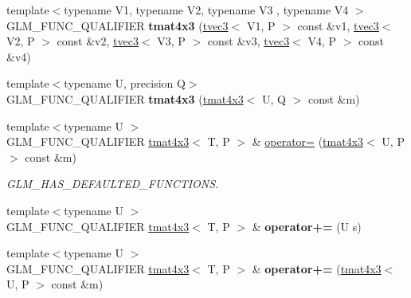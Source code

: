 \begin{DoxyCompactItemize}
\item 
\mbox{\label{structglm_1_1tmat4x3_a39c67aaaba4ee82e36a172a8704a4920}} 
{\footnotesize template$<$typename V1, typename V2, typename V3 , typename V4 $>$ }\\G\+L\+M\+\_\+\+F\+U\+N\+C\+\_\+\+Q\+U\+A\+L\+I\+F\+I\+ER {\bfseries tmat4x3} (\hyperlink{structglm_1_1tvec3}{tvec3}$<$ V1, P $>$ const \&v1, \hyperlink{structglm_1_1tvec3}{tvec3}$<$ V2, P $>$ const \&v2, \hyperlink{structglm_1_1tvec3}{tvec3}$<$ V3, P $>$ const \&v3, \hyperlink{structglm_1_1tvec3}{tvec3}$<$ V4, P $>$ const \&v4)
\item 
\mbox{\label{structglm_1_1tmat4x3_a977e48f213b5720e0c38342c955cfd3e}} 
{\footnotesize template$<$typename U, precision Q$>$ }\\G\+L\+M\+\_\+\+F\+U\+N\+C\+\_\+\+Q\+U\+A\+L\+I\+F\+I\+ER {\bfseries tmat4x3} (\hyperlink{structglm_1_1tmat4x3}{tmat4x3}$<$ U, Q $>$ const \&m)
\item 
\mbox{\label{structglm_1_1tmat4x3_a45e2023a951f58d15675733993dd3f7a}} 
{\footnotesize template$<$typename U $>$ }\\G\+L\+M\+\_\+\+F\+U\+N\+C\+\_\+\+Q\+U\+A\+L\+I\+F\+I\+ER \hyperlink{structglm_1_1tmat4x3}{tmat4x3}$<$ T, P $>$ \& \hyperlink{structglm_1_1tmat4x3_a45e2023a951f58d15675733993dd3f7a}{operator=} (\hyperlink{structglm_1_1tmat4x3}{tmat4x3}$<$ U, P $>$ const \&m)
\begin{DoxyCompactList}\small\item\em G\+L\+M\+\_\+\+H\+A\+S\+\_\+\+D\+E\+F\+A\+U\+L\+T\+E\+D\+\_\+\+F\+U\+N\+C\+T\+I\+O\+NS. \end{DoxyCompactList}\item 
\mbox{\label{structglm_1_1tmat4x3_a81802f6d7ccf5136033aa43964c05b51}} 
{\footnotesize template$<$typename U $>$ }\\G\+L\+M\+\_\+\+F\+U\+N\+C\+\_\+\+Q\+U\+A\+L\+I\+F\+I\+ER \hyperlink{structglm_1_1tmat4x3}{tmat4x3}$<$ T, P $>$ \& {\bfseries operator+=} (U s)
\item 
\mbox{\label{structglm_1_1tmat4x3_ac3328dbd930d4608781f9199cc793d17}} 
{\footnotesize template$<$typename U $>$ }\\G\+L\+M\+\_\+\+F\+U\+N\+C\+\_\+\+Q\+U\+A\+L\+I\+F\+I\+ER \hyperlink{structglm_1_1tmat4x3}{tmat4x3}$<$ T, P $>$ \& {\bfseries operator+=} (\hyperlink{structglm_1_1tmat4x3}{tmat4x3}$<$ U, P $>$ const \&m)

\end{DoxyCompactItemize}
